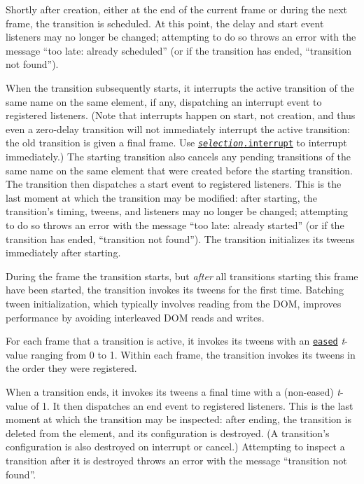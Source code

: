 Shortly after creation, either at the end of the current frame or during the next frame, the transition is scheduled. At this point, the delay and {\ttfamily start} event listeners may no longer be changed; attempting to do so throws an error with the message “too late\+: already scheduled” (or if the transition has ended, “transition not found”).

When the transition subsequently starts, it interrupts the active transition of the same name on the same element, if any, dispatching an {\ttfamily interrupt} event to registered listeners. (Note that interrupts happen on start, not creation, and thus even a zero-\/delay transition will not immediately interrupt the active transition\+: the old transition is given a final frame. Use \href{#selection_interrupt}{\tt {\itshape selection}.interrupt} to interrupt immediately.) The starting transition also cancels any pending transitions of the same name on the same element that were created before the starting transition. The transition then dispatches a {\ttfamily start} event to registered listeners. This is the last moment at which the transition may be modified\+: after starting, the transition’s timing, tweens, and listeners may no longer be changed; attempting to do so throws an error with the message “too late\+: already started” (or if the transition has ended, “transition not found”). The transition initializes its tweens immediately after starting.

During the frame the transition starts, but {\itshape after} all transitions starting this frame have been started, the transition invokes its tweens for the first time. Batching tween initialization, which typically involves reading from the D\+OM, improves performance by avoiding interleaved D\+OM reads and writes.

For each frame that a transition is active, it invokes its tweens with an \href{#transition_ease}{\tt eased} {\itshape t}-\/value ranging from 0 to 1. Within each frame, the transition invokes its tweens in the order they were registered.

When a transition ends, it invokes its tweens a final time with a (non-\/eased) {\itshape t}-\/value of 1. It then dispatches an {\ttfamily end} event to registered listeners. This is the last moment at which the transition may be inspected\+: after ending, the transition is deleted from the element, and its configuration is destroyed. (A transition’s configuration is also destroyed on interrupt or cancel.) Attempting to inspect a transition after it is destroyed throws an error with the message “transition not found”. 